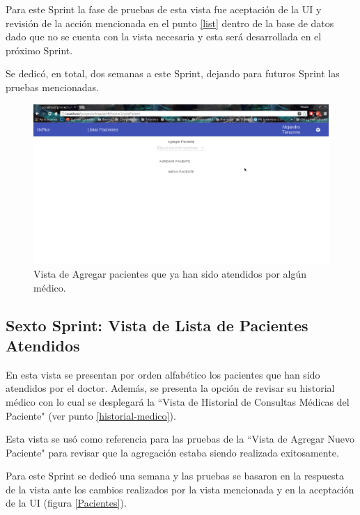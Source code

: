      Para este Sprint la fase de pruebas de esta vista fue aceptación de la UI y revisión de la acción mencionada en el punto \ref{list} dentro de la base de datos dado que no se cuenta con la vista necesaria y esta será desarrollada en el próximo Sprint.
    
    Se dedicó, en total, dos semanas a este Sprint, dejando para futuros Sprint las pruebas mencionadas.
    
    \begin{figure}[htbp!]
        \begin{center}
            \includegraphics[width=.8\textwidth]{figures/p8}
        \end{center}
        \caption{Vista de Agregar pacientes que ya han sido atendidos por algún médico.}
        \label{Agregar}
    \end{figure}
    
    \subsection{Sexto Sprint: Vista de Lista de Pacientes Atendidos}
    
    En esta vista se presentan por orden alfabético los pacientes que han sido atendidos por el doctor. Además, se presenta la opción de revisar su historial médico con lo cual se desplegará la ``Vista de Historial de Consultas Médicas del Paciente" (ver punto \ref{historial-medico}).
    
    Esta vista se usó como referencia para las pruebas de la ``Vista de Agregar Nuevo Paciente" para revisar que la agregación estaba siendo realizada exitosamente.
    
    Para este Sprint se dedicó una semana y las pruebas se basaron en la respuesta de la vista ante los cambios realizados por la vista mencionada y en la aceptación de la UI (figura \ref{Pacientes}).
    
